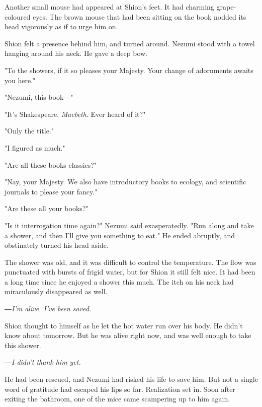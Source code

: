 Another small mouse had appeared at Shion's feet. It had charming
grape-coloured eyes. The brown mouse that had been sitting on the book
nodded its head vigorously as if to urge him on.


Shion felt a presence behind him, and turned around. Nezumi stood with a
towel hanging around his neck. He gave a deep bow.

"To the showers, if it so pleases your Majesty. Your change of
adornments awaits you here."

"Nezumi, this book―"

"It's Shakespeare. \emph{Macbeth}. Ever heard of it?"

"Only the title."

"I figured as much."

"Are all these books classics?"

"Nay, your Majesty. We also have introductory books to ecology, and
scientific journals to please your fancy."

"Are these all your books?"

"Is it interrogation time again?" Nezumi said exasperatedly. "Run along
and take a shower, and then I'll give you something to eat." He ended
abruptly, and obstinately turned his head aside.

\myspace

The shower was old, and it was difficult to control the temperature. The
flow was punctuated with bursts of frigid water, but for Shion it still
felt nice. It had been a long time since he enjoyed a shower this much.
The itch on his neck had miraculously disappeared as well.

\emph{―I'm alive. I've been saved.}

Shion thought to himself as he let the hot water run over his body. He
didn't know about tomorrow. But he was alive right now, and was well
enough to take this shower.

\emph{―I didn't thank him yet.}

He had been rescued, and Nezumi had risked his life to save him. But not
a single word of gratitude had escaped his lips so far. Realization set
in. Soon after exiting the bathroom, one of the mice came scampering up
to him again.


